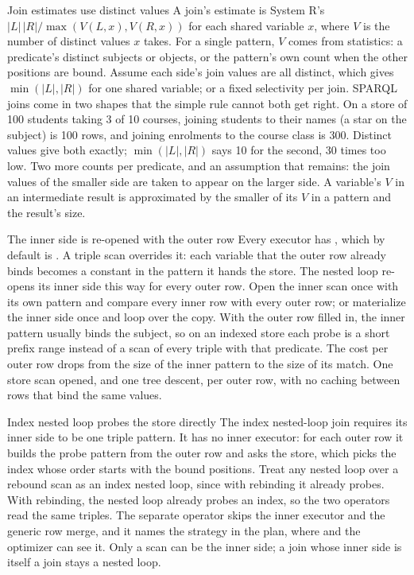 \begin{decision}{Join estimates use distinct values}
 A join's estimate is System R's
$|L|\,|R| / \max(V(L,x), V(R,x))$ for each shared variable $x$, where $V$ is
the number of distinct values $x$ takes. For a single pattern, $V$ comes from
statistics: a predicate's distinct subjects or objects, or the pattern's own
count when the other positions are bound.
 Assume each side's join values are all distinct, which
gives $\min(|L|, |R|)$ for one shared variable; or a fixed selectivity per join.
 SPARQL joins come in two shapes that the simple rule cannot both
get right. On a store of 100 students taking 3 of 10 courses, joining students
to their names (a star on the subject) is 100 rows, and joining enrolments to
the course class is 300. Distinct values give both exactly; $\min(|L|,|R|)$
says 10 for the second, 30 times too low.
 Two more counts per predicate, and an assumption that remains: the
join values of the smaller side are taken to appear on the larger side. A
variable's $V$ in an intermediate result is approximated by the smaller of its
$V$ in a pattern and the result's size.
\end{decision}

\begin{decision}{The inner side is re-opened with the outer row}
 Every executor has , which by default is
. A triple scan overrides it: each variable that the outer row
already binds becomes a constant in the pattern it hands the store. The nested
loop re-opens its inner side this way for every outer row.
 Open the inner scan once with its own pattern and compare
every inner row with every outer row; or materialize the inner side once and
loop over the copy.
 With the outer row filled in, the inner pattern usually binds the
subject, so on an indexed store each probe is a short prefix range instead of
a scan of every triple with that predicate. The cost per outer row drops from
the size of the inner pattern to the size of its match.
 One store scan opened, and one tree descent, per outer row, with
no caching between rows that bind the same values.
\end{decision}

\begin{decision}{Index nested loop probes the store directly}
 The index nested-loop join requires its inner side to be one
triple pattern. It has no inner executor: for each outer row it builds the
probe pattern from the outer row and asks the store, which picks the index
whose order starts with the bound positions.
 Treat any nested loop over a rebound scan as an index
nested loop, since with rebinding it already probes.
 With rebinding, the nested loop already probes an index, so the
two operators read the same triples. The separate operator skips the inner
executor and the generic row merge, and it names the strategy in the plan,
where  and the optimizer can see it.
 Only a scan can be the inner side; a join whose inner side is
itself a join stays a nested loop.
\end{decision}

